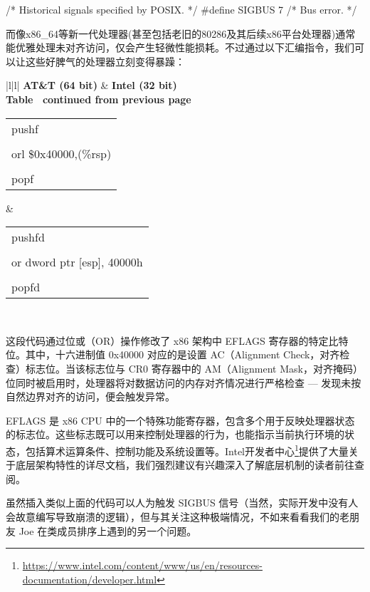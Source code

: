 \begin{cpp}
/* Historical signals specified by POSIX. */
#define SIGBUS         7    /* Bus error. */
\end{cpp}

而像x86\_64等新一代处理器(甚至包括老旧的80286及其后续x86平台处理器)通常能优雅处理未对齐访问，仅会产生轻微性能损耗。不过通过以下汇编指令，我们可以让这些好脾气的处理器立刻变得暴躁：

\begin{longtable}{|l|l|}
\hline
\textbf{AT\&T (64 bit)} &
  \textbf{Intel (32 bit)} \\ \hline
\endfirsthead
%
%
{{\bfseries Table \thetable\ continued from previous page}} \\
\endhead
%
\begin{tabular}[c]{@{}l@{}}pushf \\ \\ orl \$0x40000,(\%rsp) \\ \\ popf\end{tabular} &
  \begin{tabular}[c]{@{}l@{}}pushfd\\ \\ or dword ptr {[}esp{]}, 40000h \\ \\ popfd\end{tabular} \\ \hline
\end{longtable}

这段代码通过位或（OR）操作修改了 x86 架构中 EFLAGS 寄存器的特定比特位。其中，十六进制值 0x40000 对应的是设置 AC（Alignment Check，对齐检查）标志位。当该标志位与 CR0 寄存器中的 AM（Alignment Mask，对齐掩码）位同时被启用时，处理器将对数据访问的内存对齐情况进行严格检查 --- 发现未按自然边界对齐的访问，便会触发异常。

EFLAGS 是 x86 CPU 中的一个特殊功能寄存器，包含多个用于反映处理器状态的标志位。这些标志既可以用来控制处理器的行为，也能指示当前执行环境的状态，包括算术运算条件、控制功能及系统设置等。Intel开发者中心\footnote{\url{https://www.intel.com/content/www/us/en/resources-documentation/developer.html}}提供了大量关于底层架构特性的详尽文档，我们强烈建议有兴趣深入了解底层机制的读者前往查阅。

虽然插入类似上面的代码可以人为触发 SIGBUS 信号（当然，实际开发中没有人会故意编写导致崩溃的逻辑），但与其关注这种极端情况，不如来看看我们的老朋友 Joe 在类成员排序上遇到的另一个问题。
